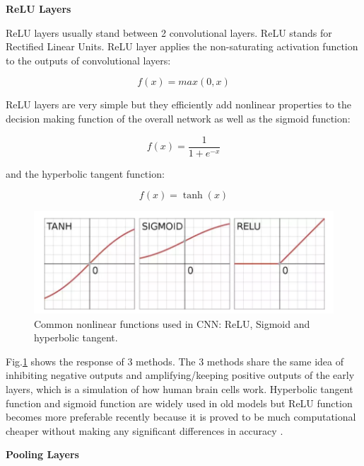 \textbf{ReLU Layers} 

ReLU layers usually stand between 2 convolutional layers. ReLU stands for Rectified Linear Units. ReLU layer applies the non-saturating activation function to the outputs of convolutional layers:

\begin{equation} \label{eq:relu}
f(x) = max(0,x)
\end{equation}

ReLU layers are very simple but they efficiently add nonlinear properties to the decision
making function of the overall network as well as the sigmoid function:

\begin{equation} \label{eq:sigmoid}
f(x) = \frac{1}{1+e^{-x}}
\end{equation}

and the hyperbolic tangent function:

\begin{equation} \label{eq:hypo}
f(x) = \tanh(x)
\end{equation}

\begin{figure}[H]
  \centering
  \includegraphics[width=\linewidth]{figures/activation.png}
  \caption{Common nonlinear functions used in CNN: ReLU, Sigmoid and hyperbolic tangent.}
  \label{fig:activation}
\end{figure}

Fig.\ref{fig:activation} shows the response of 3 methods. The 3 methods share the same idea of inhibiting negative outputs and amplifying/keeping positive outputs of the early layers, which is a simulation of how human brain cells work. Hyperbolic tangent function and sigmoid function are widely used in old models but ReLU function becomes more preferable recently because it is proved to be much computational cheaper without making any significant differences in accuracy \cite{Krizhevsky2012}.

\textbf{Pooling Layers} 

